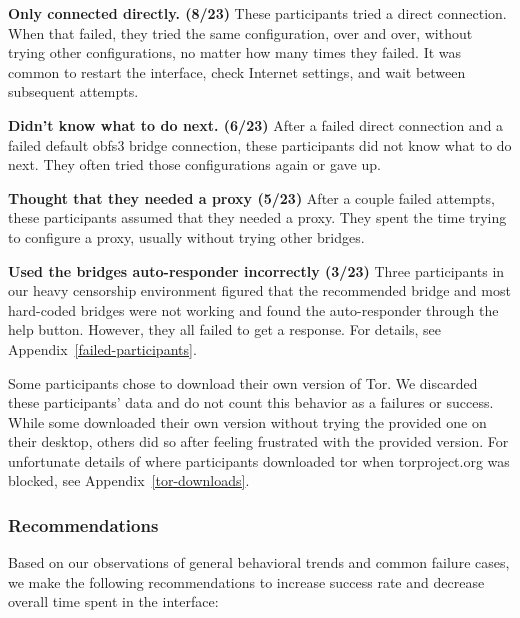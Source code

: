 \documentclass[USenglish,oneside,twocolumn]{article}
\begin{document}
\begin{description}
\item {\bfseries Only connected directly. (8/23)} These participants tried a direct connection. When that failed, they tried the same configuration, over and over, without trying other configurations, no matter how many times they failed. It was common to restart the interface, check Internet settings, and wait between subsequent attempts. 
\item {\bfseries Didn't know what to do next. (6/23)} After a failed direct connection and a failed default obfs3 bridge connection, these participants did not know what to do next. They often tried those configurations again or gave up. 
\item {\bfseries Thought that they needed a proxy (5/23)} After a couple failed attempts, these participants assumed that they needed a proxy. They spent the time trying to configure a proxy, usually without trying other bridges. 
\item {\bfseries Used the bridges auto-responder incorrectly (3/23)} Three participants in our heavy censorship environment figured that the recommended bridge and most hard-coded bridges were not working and found the auto-responder through the help button. However, they all failed to get a response. For details, see Appendix~\ref{failed-participants}.
\end{description} 

Some participants chose to download their own version of Tor. We discarded these participants' data and do not count this behavior as a failures or success. While some downloaded their own version without trying the provided one on their desktop, others did so after feeling frustrated with the provided version. For unfortunate details of where participants downloaded tor when torproject.org was blocked, see Appendix~\ref{tor-downloads}.

\subsubsection{Recommendations}
\label{recommendations}
Based on our observations of general behavioral trends and common failure cases, we make the following recommendations to increase success rate and decrease overall time spent in the interface: \\
\end{document}
